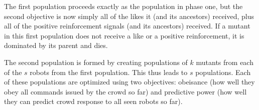 \documentclass[12pt]{article}
\begin{document}
The first population proceeds exactly as the
population in phase one, but the second objective
is now simply all of the likes it
(and its ancestors) received, plus all of the
positive reinforcement signals (and its ancestors)
received. If a mutant in this first population does
not receive a like or a positive reinforcement,
it is dominated by its parent and dies.

The second population is formed by creating
populations of $k$ mutants from each of the
$s$ robots from the first population.
This thus leads to $s$ populations. Each of
these populations are optimized using two
objectives: obeisance (how well they obey
all commands issued by the crowd so far)
and predictive power (how well they can predict
crowd response to all seen robots so far).
\end{document}

